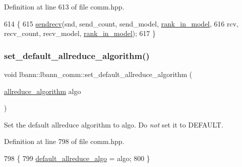 Definition at line 613 of file comm.\+hpp.


\begin{DoxyCode}
614                                                         \{
615     \hyperlink{classlbann_1_1lbann__comm_a6314e3b07b21b8fb0cd2ebe1e49dddb9}{sendrecv}(snd, send\_count, send\_model, \hyperlink{classlbann_1_1lbann__comm_a0dcccd57c2b591eb7682e192e0a09033}{rank\_in\_model},
616              rcv, recv\_count, recv\_model, \hyperlink{classlbann_1_1lbann__comm_a0dcccd57c2b591eb7682e192e0a09033}{rank\_in\_model});
617   \}
\end{DoxyCode}
\mbox{\label{classlbann_1_1lbann__comm_aaae50e4643ca06671e7cb7872d455708}} 
\subsubsection{\texorpdfstring{set\+\_\+default\+\_\+allreduce\+\_\+algorithm()}{set\_default\_allreduce\_algorithm()}}
{\footnotesize\ttfamily void lbann\+::lbann\+\_\+comm\+::set\+\_\+default\+\_\+allreduce\+\_\+algorithm (\begin{DoxyParamCaption}\item[{\hyperlink{classlbann_1_1lbann__comm_a02a03227cc27e3516f0d9f9812f32019}{allreduce\+\_\+algorithm}}]{algo }\end{DoxyParamCaption})\hspace{0.3cm}{\ttfamily [inline]}}

Set the default allreduce algorithm to algo. Do {\itshape not} set it to D\+E\+F\+A\+U\+LT. 

Definition at line 798 of file comm.\+hpp.


\begin{DoxyCode}
798                                                                  \{
799     \hyperlink{classlbann_1_1lbann__comm_ac7731d6bcdb6775009467cf4138d4bab}{default\_allreduce\_algo} = algo;
800   \}
\end{DoxyCode}
\mbox{\label{classlbann_1_1lbann__comm_a44bc6b8683f04c2a3fc2f01fc734a946}} 
